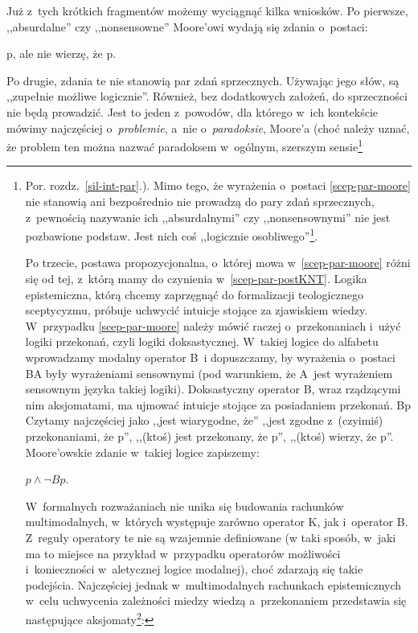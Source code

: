 Już z~tych krótkich fragmentów możemy wyciągnąć kilka wniosków. Po pierwsze, ,,absurdalne'' czy ,,nonsensowne'' Moore'owi wydają się zdania o~postaci:

p, ale nie wierzę, że p.\label{scep-par-moore}

Po drugie, zdania te nie stanowią par zdań sprzecznych. Używając jego słów, są ,,zupełnie możliwe logicznie''. Również, bez dodatkowych założeń, do sprzeczności nie będą prowadzić. Jest to jeden z~powodów, dla którego w~ich kontekście mówimy najczęściej o~\textit{problemie}, a~nie o~\textit{paradoksie}, Moore'a (choć należy uznać, że problem ten można nazwać paradoksem w~ogólnym, szerszym sensie\footnote{Por. rozdz.~{\ref{sil-int-par}.}). Mimo tego, że wyrażenia o~postaci \ref{scep-par-moore} nie stanowią ani bezpośrednio nie prowadzą do pary zdań sprzecznych, z~pewnością nazywanie ich ,,absurdalnymi'' czy ,,nonsensownymi'' nie jest pozbawione podstaw. Jest nich coś ,,logicznie osobliwego''\footnote{Por. H. Tennessen, \textit{Logical Oddities and Locutional Scarcities: Another Attack upon Methods of Revelation}, ``Synthese'', vol. 11 (1959), nr 4, ss.~369-388.}.

Po trzecie, postawa propozycjonalna, o~której mowa w~\ref{scep-par-moore} różni się od tej, z~którą mamy do czynienia w~\ref{scep-par-postKNT}. Logika epistemiczna, którą chcemy zaprzęgnąć do formalizacji teologicznego sceptycyzmu, próbuje uchwycić intuicje stojące za zjawiskiem wiedzy. W~przypadku \ref{scep-par-moore} należy mówić raczej o~przekonaniach i~użyć logiki przekonań, czyli logiki doksastycznej. W~takiej logice do alfabetu wprowadzamy modalny operator B~i dopuszczamy, by wyrażenia o~postaci BA były wyrażeniami sensownymi (pod warunkiem, że A~jest wyrażeniem sensownym języka takiej logiki). Doksastyczny operator B, wraz rządzącymi nim aksjomatami, ma ujmować intuicje stojące za posiadaniem przekonań. Bp Czytamy najczęściej jako ,,jest wiarygodne, że'' ,,jest zgodne z~(czyimiś) przekonaniami, że p'', ,,(ktoś) jest przekonany, że p'', ,,(ktoś) wierzy, że p''. Moore'owskie zdanie w~takiej logice zapiszemy:

$p \land \neg B p$.\label{scep-par-moore-form}

W~formalnych rozważaniach nie unika się budowania rachunków multimodalnych, w~których występuje zarówno operator K, jak i~operator B. Z~reguły operatory te nie są wzajemnie definiowane (w taki sposób, w~jaki ma to miejsce na przykład w~przypadku operatorów możliwości i~konieczności w~aletycznej logice modalnej), choć zdarzają się takie podejścia. Najczęściej jednak w~multimodalnych rachunkach epistemicznych w~celu uchwycenia zależności miedzy wiedzą a~przekonaniem przedstawia się następujące aksjomaty\footnote{Por. J-J.C.Meyer, Modal Epistemic and Doxastic Logic, [w:] Handbook of Philosophical Logic, vol. 10, red. D.M. Gabbay, F. Guenthner, Springer, Dordrecht 2003, s.~6 oraz R. Rendsvig, J. Symons, \textit{Epistemic Logic}, [w:] \textit{The Stanford Encyclopedia of Philosophy} (wydanie lato 2021), red. E.N. Zalta.}:

}
